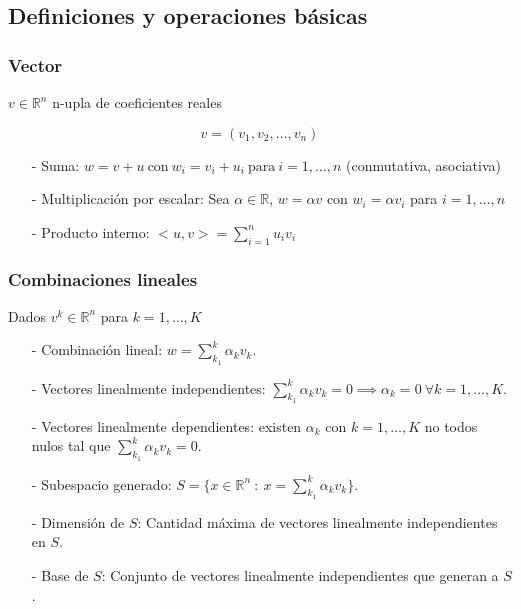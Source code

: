 \subsection{Definiciones y operaciones básicas}
\label{subsec:definiciones_y_operaciones_basicas}

\subsubsection{Vector}
\label{subsubsec:vector}

$v \in \mathbb{R}^{n}$ n-upla de coeficientes reales

\[ v = (v_1,v_2,\ldots,v_n)\]

\begin{itemize}
    \item[-] Suma: $w = v + u ~\text{con}~ w_i = v_i + u_i ~\text{para}~ i = 1,\ldots,n$ (conmutativa, asociativa)
    \item[-] Multiplicación por escalar: Sea $\alpha \in \mathbb{R}$, $w = \alpha v$ con $w_i = \alpha v_i$ para $i = 1,\ldots,n$
    \item[-] Producto interno: $<u,v> = \sum_{i=1}^{n}u_i v_i$
\end{itemize}

\subsubsection{Combinaciones lineales}
\label{subsubsec:combinaciones_lineales}

Dados $v^{k} \in \mathbb{R}^n$ para $k = 1,\ldots,K$

\begin{itemize}
    \item[-] Combinación lineal: $w = \sum_{k_1}^{k}\alpha_k v_{k}$.
    \item[-] Vectores linealmente independientes: $\sum_{k_1}^{k}\alpha_k v_{k} = 0 \implies \alpha_k = 0 ~\forall k = 1,\ldots,K$.
    \item[-] Vectores linealmente dependientes: existen $\alpha_k$ con $k = 1,\ldots, K$ no todos nulos tal que $\sum_{k_1}^{k}\alpha_k v_{k} = 0$.
    \item[-] Subespacio generado: $S = \{x \in \mathbb{R}^{n} ~:~ x = \sum_{k_1}^{k}\alpha_k v_{k}\}$.
    \item[-] Dimensión de $S$: Cantidad máxima de vectores linealmente independientes en $S$.
    \item[-] Base de $S$: Conjunto de vectores linealmente independientes que generan a $S$.
\end{itemize}

